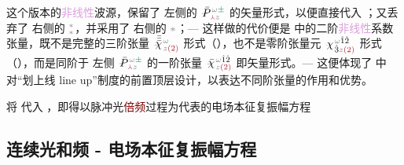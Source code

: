 这个版本的\textcolor{Plum}{非线性}\textcolor{NavyBlue}{波源}，保留了  左侧的 $\Xint{\mathcolor{gray}{-}}{25}{\bar{P}}^{\;\! \mathcolor{gray}{\omega} \textcolor{PineGreen}{\pm}}_{\;\! \textcolor{Maroon}{\Yup} \mathcolor{gray}{z}}$ 的矢量形式，以便直接代入 ；又丢弃了  右侧的 ${}^{\mathcolor{gray}{*}}_{\mathcolor{gray}{*}}$，并采用了  右侧的 $\mathcolor{gray}{*}$；--- 这样做的代价便是  中的二阶\textcolor{Plum}{非线性}系数张量，既不是完整的三阶张量 $\Xint{{}^{}_{\mathcolor{gray}{-}}}{23}{\bar{\bar{\bar{\chi}}}}^{\;\! \mathcolor{gray}{\omega} }_{\;\! \mathcolor{gray}{z} \textcolor{Maroon}{(2)} }$ 形式（），也不是零阶张量元 $\Xint{{}^{}_{\mathcolor{gray}{-}}}{23}{\chi}^{\;\! \mathcolor{gray}{\omega} \hat{1} \hat{2} }_{\;\! \hat{3} \mathcolor{gray}{z} \textcolor{Maroon}{(2)} }$ 形式（），而是同阶于  左侧 $\Xint{\mathcolor{gray}{-}}{25}{\bar{P}}^{\;\! \mathcolor{gray}{\omega} \textcolor{PineGreen}{\pm}}_{\;\! \textcolor{Maroon}{\Yup} \mathcolor{gray}{z}}$ 的一阶张量 $\Xint{{}^{}_{\mathcolor{gray}{-}}}{23}{\bar{\chi}}^{\;\! \mathcolor{gray}{\omega} \hat{1} \hat{2} }_{\;\! \mathcolor{gray}{z} \textcolor{Maroon}{(2)} }$ 即矢量形式。--- 这便体现了  中对“划上线 line up”制度的前置顶层设计，以表达不同阶张量的作用和优势。

将  代入 ，即得以\textcolor{NavyBlue}{脉冲光}\textcolor{Maroon}{倍频}过程为代表的电场\textcolor{PineGreen}{本征复振幅}方程

\subsection{连续光和频 - 电场本征复振幅方程}\label{ssec:SFG_discrete}

